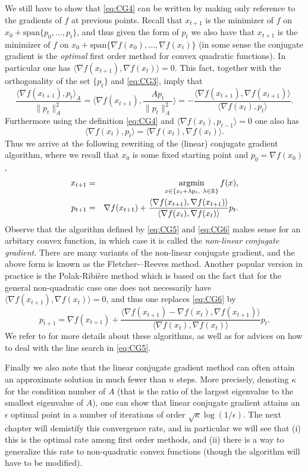 We still have to show that \eqref{eq:CG4} can be written by making only reference to the gradients of $f$ at previous points. Recall that $x_{t+1}$ is the minimizer of $f$ on $x_0 + \mathrm{span}\{p_0, \hdots, p_t\}$, and thus given the form of $p_t$ we also have that $x_{t+1}$ is the minimizer of $f$ on $x_0 + \mathrm{span}\{\nabla f(x_0), \hdots, \nabla f(x_t)\}$ (in some sense the conjugate gradient is the {\em optimal} first order method for convex quadratic functions). In particular one has $\langle \nabla f(x_{t+1}) , \nabla f(x_t) \rangle = 0$. This fact, together with the orthogonality of the set $\{p_t\}$ and \eqref{eq:CG3}, imply that
$$\frac{\langle \nabla f(x_{t+1}) , p_{t} \rangle_A}{\|p_t\|_A^2} = \langle \nabla f(x_{t+1}) , \frac{A p_{t}}{\|p_t\|_A^2}  \rangle = - \frac{\langle \nabla f(x_{t+1})  , \nabla f(x_{t+1}) \rangle}{\langle \nabla f(x_{t})  , p_t \rangle} .$$
Furthermore using the definition \eqref{eq:CG4} and $\langle \nabla f(x_t) , p_{t-1} \rangle = 0$ one also has
$$\langle \nabla f(x_t), p_t \rangle = \langle \nabla f(x_t) , \nabla f(x_t) \rangle .$$
Thus we arrive at the following rewriting of the (linear) conjugate gradient algorithm, where we recall that $x_0$ is some fixed starting point and $p_0 = \nabla f(x_0)$,
\begin{eqnarray}
x_{t+1} & = & \mathop{\mathrm{argmin}}_{x \in \left\{x_t + \lambda p_t, \ \lambda \in \mathbb{R} \right\}} f(x) , \label{eq:CG5} \\
p_{t+1} & = & \nabla f(x_{t+1}) + \frac{\langle \nabla f(x_{t+1})  , \nabla f(x_{t+1}) \rangle}{\langle \nabla f(x_{t})  , \nabla f(x_t) \rangle} p_t . \label{eq:CG6}
\end{eqnarray}
Observe that the algorithm defined by \eqref{eq:CG5} and \eqref{eq:CG6} makes sense for an arbitary convex function, in which case it is called the {\em non-linear conjugate gradient}. There are many variants of the non-linear conjugate gradient, and the above form is known as the Fletcher-–Reeves method. Another popular version in practice is the Polak-Ribi{\`e}re method which is based on the fact that for the general non-quadratic case one does not necessarily have $\langle \nabla f(x_{t+1}) , \nabla f(x_t) \rangle = 0$, and thus one replaces \eqref{eq:CG6} by
$$p_{t+1} = \nabla f(x_{t+1}) + \frac{\langle \nabla f(x_{t+1})  - \nabla f(x_t), \nabla f(x_{t+1}) \rangle}{\langle \nabla f(x_{t})  , \nabla f(x_t) \rangle} p_t .$$
We refer to \cite{NW06} for more details about these algorithms, as well as for advices on how to deal with the line search in \eqref{eq:CG5}.

Finally we also note that the linear conjugate gradient method can often attain an approximate solution in much fewer than $n$ steps. More precisely, denoting $\kappa$ for the condition number of $A$ (that is the ratio of the largest eigenvalue to the smallest eigenvalue of $A$), one can show that linear conjugate gradient attains an $\epsilon$ optimal point in a number of iterations of order $\sqrt{\kappa} \log(1/\epsilon)$. The next chapter will demistify this convergence rate, and in particular we will see that (i) this is the optimal rate among first order methods, and (ii) there is a way to generalize this rate to non-quadratic convex functions (though the algorithm will have to be modified).

